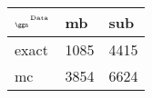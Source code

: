 \begin{tabular}{lll}
    \toprule
    $_{\text{\tiny{\ggn}}}$$^{\text{\tiny{Data}}}$ & mb & sub \\
    \midrule
    exact & 1085
              & 4415 \\
    mc   & 3854
              & 6624 \\
    \bottomrule
\end{tabular}